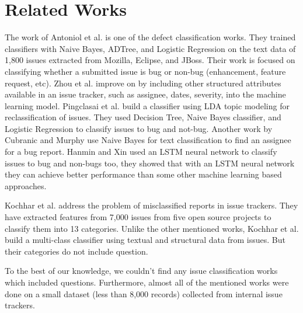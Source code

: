 \documentclass[conference]{IEEEtran}
\begin{document}
\section{Related Works}\label{relworks}

The work of Antoniol et al. \cite{10.1145/1463788.1463819} is one of the defect classification works. They trained  
classifiers with Naive Bayes, ADTree, and Logistic Regression on the text data of 1,800 issues extracted 
from Mozilla, Eclipse, and JBoss. Their work is focused on classifying whether a submitted issue is bug or 
non-bug (enhancement, feature request, etc). Zhou et al. \cite{6976097} improve on   \cite{10.1145/1463788.1463819} 
by including other structured attributes available in an issue tracker,
such as assignee, dates, severity, into the machine learning model. Pingclasai et al. \cite{6754344} build a 
classifier using LDA topic modeling for reclassification of issues. 
They used Decision Tree, Naive Bayes classifier, and Logistic Regression to classify issues to bug and not-bug. 
Another work by Cubranic and Murphy \cite{1814517} use Naive Bayes for text classification 
to find an assignee for a bug report. Hanmin and Xin used an LSTM neural network \cite{10.1145/3275219.3275239}
to classify issues to bug and non-bugs too, they showed that with an LSTM neural network they can achieve better 
performance than some other machine learning based approaches.

Kochhar et al. \cite{6923127} address the problem of misclassified reports in issue trackers. They have 
extracted features from 7,000 issues from five open source projects to classify them into 13 categories. Unlike
the other mentioned works, Kochhar et al. build a multi-class classifier using textual and structural data from 
issues. But their categories do not include question.

To the best of our knowledge, we couldn't find any issue classification works which included questions. Furthermore, 
almost all of the mentioned works were done on a small dataset (less than 8,000 records) collected from internal 
issue trackers.
\end{document}
